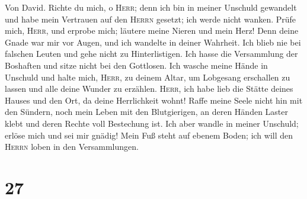  Von David. Richte du mich, o \textsc{Herr}; denn ich bin
in meiner Unschuld gewandelt und habe mein Vertrauen auf den
\textsc{Herrn} gesetzt; ich werde nicht wanken.  Prüfe
mich, \textsc{Herr}, und erprobe mich; läutere meine Nieren und mein
Herz!  Denn deine Gnade war mir vor Augen, und ich
wandelte in deiner Wahrheit.  Ich blieb nie bei falschen
Leuten und gehe nicht zu Hinterlistigen.  Ich hasse die
Versammlung der Boshaften und sitze nicht bei den Gottlosen.
 Ich wasche meine Hände in Unschuld und halte mich,
\textsc{Herr}, zu deinem Altar,  um Lobgesang erschallen
zu lassen und alle deine Wunder zu erzählen. 
\textsc{Herr}, ich habe lieb die Stätte deines Hauses und den Ort, da
deine Herrlichkeit wohnt!  Raffe meine Seele nicht hin mit
den Sündern, noch mein Leben mit den Blutgierigen,  an
deren Händen Laster klebt und deren Rechte voll Bestechung ist.
 Ich aber wandle in meiner Unschuld; erlöse mich und sei
mir gnädig!  Mein Fuß steht auf ebenem Boden; ich will
den \textsc{Herrn} loben in den Versammlungen.

\hypertarget{section-26}{%
\section{27}\label{section-26}}

